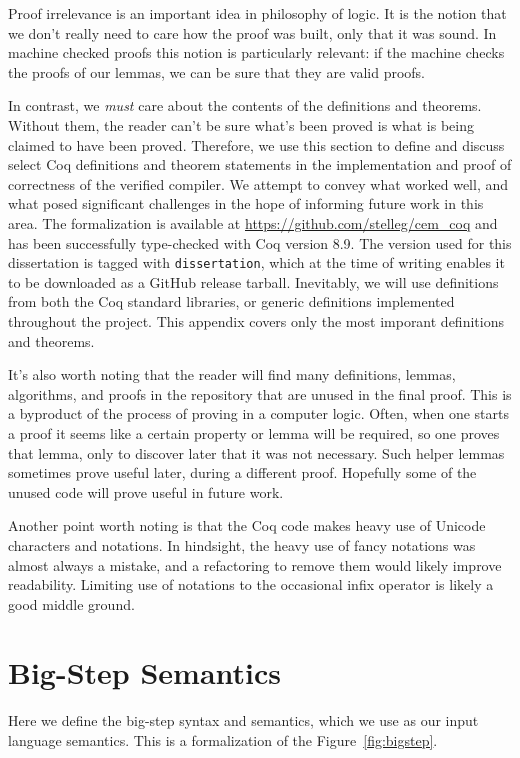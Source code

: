 
Proof irrelevance is an important idea in philosophy of logic. It is the notion
that we don't really need to care how the proof was built, only that it was
sound. In machine checked proofs this notion is particularly relevant: if the
machine checks the proofs of our lemmas, we can be sure that they are valid
proofs.

In contrast, we \emph{must} care about the contents of the definitions and
theorems. Without them, the reader can't be sure what's been proved is what is
being claimed to have been proved. Therefore, we use this section to define and
discuss select Coq definitions and theorem statements in the implementation and
proof of correctness of the verified compiler. We attempt to convey what worked
well, and what posed significant challenges in the hope of informing future work
in this area. The formalization is available at
\url{https://github.com/stelleg/cem\_coq} and has been successfully type-checked
with Coq version 8.9.  The version used for this dissertation is tagged with
\texttt{dissertation}, which at the time of writing enables it to be downloaded
as a GitHub release tarball. Inevitably, we will use definitions from both the
Coq standard libraries, or generic definitions implemented throughout the
project. This appendix covers only the most imporant definitions and theorems. 

It's also worth noting that the reader will find many definitions, lemmas,
algorithms, and proofs in the repository that are unused in the final proof.
This is a byproduct of the process of proving in a computer logic. Often, when
one starts a proof it seems like a certain property or lemma will be required,
so one proves that lemma, only to discover later that it was not necessary. Such
helper lemmas sometimes prove useful later, during a different proof. Hopefully
some of the unused code will prove useful in future work.

Another point worth noting is that the Coq code makes heavy use of Unicode
characters and notations. In hindsight, the heavy use of fancy notations was
almost always a mistake, and a refactoring to remove them would likely improve
readability. Limiting use of notations to the occasional infix operator is
likely a good middle ground.

\section{Big-Step \ce Semantics}
Here we define the big-step syntax and semantics, which we use as our input
language semantics. This is a formalization of the Figure~\ref{fig:bigstep}.


